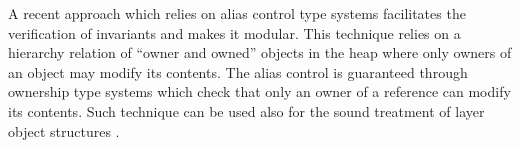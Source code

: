 	A recent approach which relies on alias control type systems \cite{DietlMueller05,Naumann-vstteFAC} facilitates the verification of invariants and 
	makes it modular. This technique relies on a hierarchy  relation of ``owner and owned'' objects  in the heap where only owners of an object may modify its contents.
	The alias control is guaranteed through ownership type systems which check that only an owner of a reference can modify its contents. 
	Such technique  can be used also for the sound treatment of layer object structures \cite{Mueller-Poetzsch-Heffter-Leavens06}.
	
	
	

        
  

